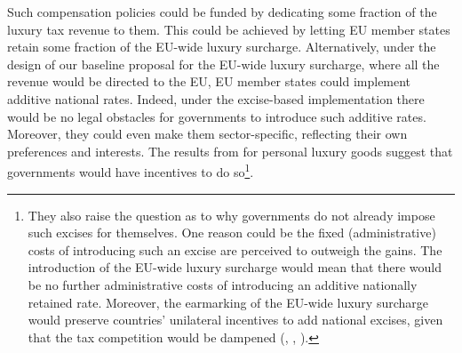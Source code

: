 \documentclass[../../main]{subfiles}
\begin{document}
Such compensation policies could be funded by dedicating some fraction of the luxury tax revenue to them. This could be achieved by letting EU member states retain some fraction of the EU-wide luxury surcharge. Alternatively, under the design of our baseline proposal for the EU-wide luxury surcharge, where all the revenue would be directed to the EU, EU member states could implement additive national rates. Indeed, under the excise-based implementation there would be no legal obstacles for governments to introduce such additive rates. Moreover, they could even make them sector-specific, reflecting their own preferences and interests. The results from \cite{Xie2026} for personal luxury goods suggest that governments would have incentives to do so\footnote{They also raise the question as to why governments do not already impose such excises for themselves. One reason could be the fixed (administrative) costs of introducing such an excise are perceived to outweigh the gains. The introduction of the EU-wide luxury surcharge would mean that there would be no further administrative costs of introducing an additive nationally retained rate. Moreover, the earmarking of the EU-wide luxury surcharge would preserve countries' unilateral incentives to add national excises, given that the tax competition would be dampened (\citet{KeenKotsogiannis2002}, \citet{DevereuxLockwoodRedoano2007}, \citet{BesleyRosen1998}).}. 


\end{document}
